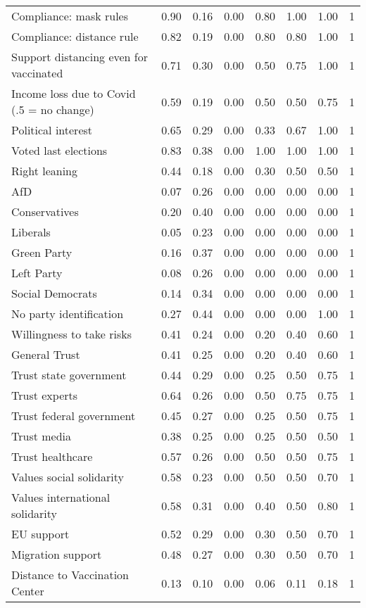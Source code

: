 \begin{table}
{\begin{tabular}[t]{lrrrrrrr}
Compliance: mask rules & 0.90 & 0.16 & 0.00 & 0.80 & 1.00 & 1.00 & 1\\
Compliance: distance rule & 0.82 & 0.19 & 0.00 & 0.80 & 0.80 & 1.00 & 1\\
Support distancing even for vaccinated & 0.71 & 0.30 & 0.00 & 0.50 & 0.75 & 1.00 & 1\\
Income loss due to Covid (.5 = no change) & 0.59 & 0.19 & 0.00 & 0.50 & 0.50 & 0.75 & 1\\
Political interest & 0.65 & 0.29 & 0.00 & 0.33 & 0.67 & 1.00 & 1\\
Voted last elections & 0.83 & 0.38 & 0.00 & 1.00 & 1.00 & 1.00 & 1\\
Right leaning & 0.44 & 0.18 & 0.00 & 0.30 & 0.50 & 0.50 & 1\\
AfD & 0.07 & 0.26 & 0.00 & 0.00 & 0.00 & 0.00 & 1\\
Conservatives & 0.20 & 0.40 & 0.00 & 0.00 & 0.00 & 0.00 & 1\\
Liberals & 0.05 & 0.23 & 0.00 & 0.00 & 0.00 & 0.00 & 1\\
Green Party & 0.16 & 0.37 & 0.00 & 0.00 & 0.00 & 0.00 & 1\\
Left Party & 0.08 & 0.26 & 0.00 & 0.00 & 0.00 & 0.00 & 1\\
Social Democrats & 0.14 & 0.34 & 0.00 & 0.00 & 0.00 & 0.00 & 1\\
No party identification & 0.27 & 0.44 & 0.00 & 0.00 & 0.00 & 1.00 & 1\\
Willingness to take risks & 0.41 & 0.24 & 0.00 & 0.20 & 0.40 & 0.60 & 1\\
General Trust & 0.41 & 0.25 & 0.00 & 0.20 & 0.40 & 0.60 & 1\\
Trust state government & 0.44 & 0.29 & 0.00 & 0.25 & 0.50 & 0.75 & 1\\
Trust experts & 0.64 & 0.26 & 0.00 & 0.50 & 0.75 & 0.75 & 1\\
Trust federal government & 0.45 & 0.27 & 0.00 & 0.25 & 0.50 & 0.75 & 1\\
Trust media & 0.38 & 0.25 & 0.00 & 0.25 & 0.50 & 0.50 & 1\\
Trust healthcare & 0.57 & 0.26 & 0.00 & 0.50 & 0.50 & 0.75 & 1\\
Values social solidarity & 0.58 & 0.23 & 0.00 & 0.50 & 0.50 & 0.70 & 1\\
Values international solidarity & 0.58 & 0.31 & 0.00 & 0.40 & 0.50 & 0.80 & 1\\
EU support & 0.52 & 0.29 & 0.00 & 0.30 & 0.50 & 0.70 & 1\\
Migration support & 0.48 & 0.27 & 0.00 & 0.30 & 0.50 & 0.70 & 1\\
Distance to Vaccination Center & 0.13 & 0.10 & 0.00 & 0.06 & 0.11 & 0.18 & 1\\
\bottomrule
\end{tabular}}
\end{table}
